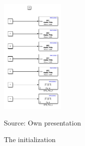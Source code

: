 	\begin{figure}[H]
		\centering
		\includegraphics[width=0.275\textwidth]{figures/init.PNG}
		\caption{The initialization}	
		Source: Own presentation	
		\label{fig:init}	
	\end{figure}
%	
%	
%	
%	
%	
